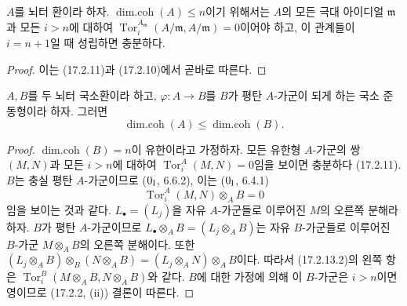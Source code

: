 \begin{corollary}[17.2.12]
\label{0.17.2.12-fr}
$A$를 뇌터 환이라 하자. $\operatorname{dim.coh}(A)\leq n$이기
위해서는 $A$의 모든 극대 아이디얼 $\mathfrak{m}$과 모든 $i>n$에
대하여
$\operatorname{Tor}^{A_{\mathfrak{m}}}_i
(A/\mathfrak{m},A/\mathfrak{m})=0$이어야 하고, 이 관계들이
$i=n+1$일 때 성립하면 충분하다.
\end{corollary}

\begin{proof}
이는 (17.2.11)과 (17.2.10)에서 곧바로 따른다.
\end{proof}

\begin{proposition}[17.2.13]
\label{0.17.2.13-fr}
$A,B$를 두 뇌터 국소환이라 하고,
$\varphi:A\longrightarrow B$를 $B$가 평탄 $A$-가군이 되게 하는 국소
준동형이라 하자. 그러면
\begin{equation}
\label{0.17.2.13.1-fr}
\tag{17.2.13.1}
  \operatorname{dim.coh}(A)\leq\operatorname{dim.coh}(B).
\end{equation}
\end{proposition}

\begin{proof}
$\operatorname{dim.coh}(B)=n$이 유한이라고 가정하자. 모든 유한형
$A$-가군의 쌍 $(M,N)$과 모든 $i>n$에 대하여
$\operatorname{Tor}^A_i(M,N)=0$임을 보이면 충분하다 (17.2.11).
$B$는 충실 평탄 $A$-가군이므로 ($0_{\rm I}$, 6.6.2), 이는
($0_{\rm I}$, 6.4.1)
\begin{equation}
\label{0.17.2.13.2-fr}
\tag{17.2.13.2}
  \operatorname{Tor}^A_i(M,N)\otimes_A B=0
\end{equation}
임을 보이는 것과 같다. $L_\bullet=(L_j)$을 자유 $A$-가군들로 이루어진
$M$의 오른쪽 분해라 하자. $B$가 평탄 $A$-가군이므로
$L_\bullet\otimes_A B=(L_j\otimes_A B)$는 자유 $B$-가군들로 이루어진
$B$-가군 $M\otimes_A B$의 오른쪽 분해이다. 또한
$(L_j\otimes_A B)\otimes_B(N\otimes_A B)
=(L_j\otimes_A N)\otimes_A B$이다. 따라서 (17.2.13.2)의 왼쪽 항은
$\operatorname{Tor}^B_i(M\otimes_A B,N\otimes_A B)$와 같다. $B$에
대한 가정에 의해 이 $B$-가군은 $i>n$이면 영이므로 (17.2.2, (ii))
결론이 따른다.
\end{proof}

